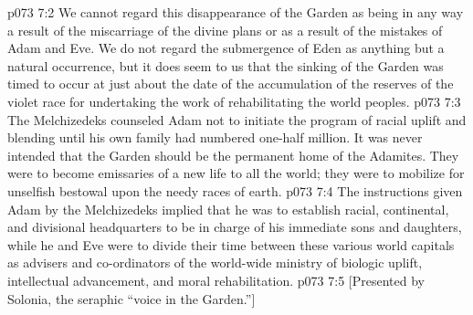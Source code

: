 \vs p073 7:2 We cannot regard this disappearance of the Garden as being in any way a result of the miscarriage of the divine plans or as a result of the mistakes of Adam and Eve. We do not regard the submergence of Eden as anything but a natural occurrence, but it does seem to us that the sinking of the Garden was timed to occur at just about the date of the accumulation of the reserves of the violet race for undertaking the work of rehabilitating the world peoples.
\vs p073 7:3 \pc The Melchizedeks counseled Adam not to initiate the program of racial uplift and blending until his own family had numbered one\hyp{}half million. It was never intended that the Garden should be the permanent home of the Adamites. They were to become emissaries of a new life to all the world; they were to mobilize for unselfish bestowal upon the needy races of earth.
\vs p073 7:4 The instructions given Adam by the Melchizedeks implied that he was to establish racial, continental, and divisional headquarters to be in charge of his immediate sons and daughters, while he and Eve were to divide their time between these various world capitals as advisers and co\hyp{}ordinators of the world\hyp{}wide ministry of biologic uplift, intellectual advancement, and moral rehabilitation.
\vsetoff
\vs p073 7:5 [Presented by Solonia, the seraphic “voice in the Garden.”]
